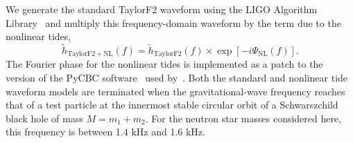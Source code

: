 We generate the standard TaylorF2 waveform using the LIGO Algorithm Library~\citep{lal} and multiply this frequency-domain waveform by the term due to the nonlinear tides,
\begin{equation}
\tilde{h}_\mathrm{TaylorF2+NL}(f) = \tilde{h}_\mathrm{TaylorF2}(f) \times \exp[-i \Psi_\mathrm{NL}(f) ].
\end{equation}
The Fourier phase for the nonlinear tides is implemented as a patch to the version of the PyCBC software~\citep{alex_nitz_2018_1208115} used by~\cite{de2018tidal}. Both the standard and nonlinear tide waveform models are terminated when the gravitational-wave frequency reaches that of a test particle at the innermost stable circular orbit of a Schwarszchild black hole of mass $M = m_1 + m_2$. For the neutron star masses considered here, this frequency is between 1.4 kHz and 1.6 kHz.

